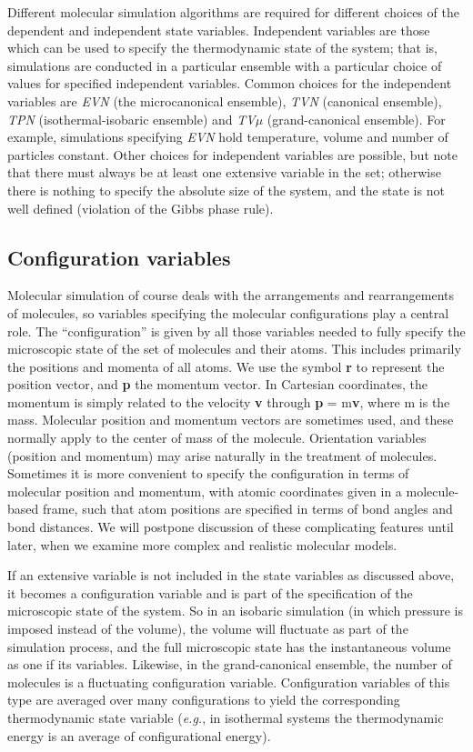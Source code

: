 \documentclass[9pt,bestpractices]{molsim}
\begin{document}
Different molecular simulation algorithms are required for different
choices of the dependent and independent state variables.
Independent variables are those which can be used to specify the thermodynamic state of the system; that is, simulations are conducted in a particular ensemble with a particular choice of values for specified independent variables.
Common choices
for the independent variables are \emph{EVN} (the microcanonical ensemble), \emph{TVN}
(canonical ensemble), \emph{TPN} (isothermal-isobaric ensemble) and \emph{TV$\mu$}
(grand-canonical ensemble).
For example, simulations specifying \emph{EVN} hold temperature, volume and number of particles constant.
Other choices for independent variables are possible, but note that
there must always be at least one extensive variable in the set;
otherwise there is nothing to specify the absolute size of the system,
and the state is not well defined (violation of the Gibbs phase rule).

\subsection{Configuration variables}\label{configuration-variables}

Molecular simulation of course deals with the arrangements and
rearrangements of molecules, so variables specifying the molecular
configurations play a central role. The ``configuration'' is given by
all those variables needed to fully specify the microscopic state of the
set of molecules and their atoms. This includes primarily the positions
and momenta of all atoms. We use the symbol \textbf{r} to represent the
position vector, and \textbf{p} the momentum vector. In Cartesian
coordinates, the momentum is simply related to the velocity \textbf{v}
through \textbf{p} = m\textbf{v}, where m is the mass. Molecular
position and momentum vectors are sometimes used, and these normally
apply to the center of mass of the molecule. Orientation variables
(position and momentum) may arise naturally in the treatment of
molecules. Sometimes it is more convenient to specify the configuration
in terms of molecular position and momentum, with atomic coordinates
given in a molecule-based frame, such that atom positions are specified
in terms of bond angles and bond distances. We will postpone discussion
of these complicating features until later, when we examine more complex
and realistic molecular models.

If an extensive variable is not included in the state variables as
discussed above, it becomes a configuration variable and is part of the specification of the microscopic state of the system.
So in an isobaric
simulation (in which pressure is imposed instead of the volume), the
volume will fluctuate as part of the simulation process, and the full
microscopic state has the instantaneous volume as one if its variables.
Likewise, in the grand-canonical ensemble, the number of molecules is a
fluctuating configuration variable. Configuration variables of this type
are averaged over many configurations to yield the corresponding
thermodynamic state variable (\emph{e.g.}, in isothermal systems the
thermodynamic energy is an average of configurational energy).
\end{document}
